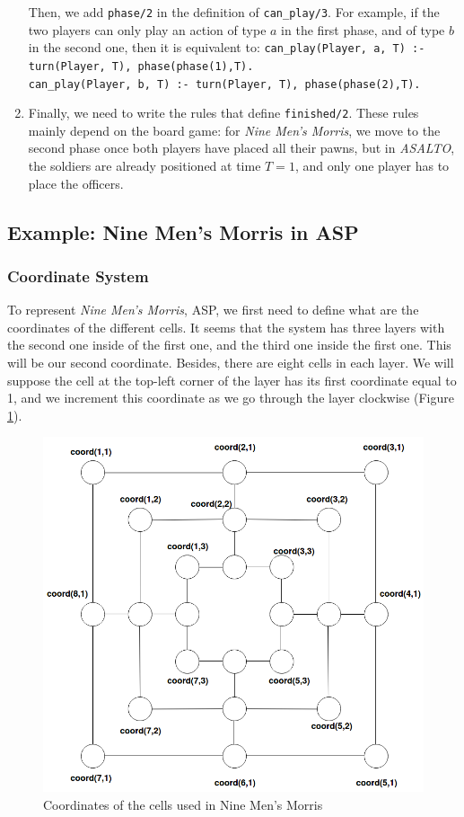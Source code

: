 \begin{enumerate}
\smallskip

Then, we add \texttt{phase/2} in the definition of \texttt{can\_play/3}. For example, if the two players can only play an action of type $a$ in the first phase, and of type $b$ in the second one, then it is equivalent to: \newline
\texttt{can\_play(Player, a, T) :- turn(Player, T), phase(phase(1),T).}\\
\texttt{can\_play(Player, b, T) :- turn(Player, T), phase(phase(2),T).}

\item Finally, we need to write the rules that define \texttt{finished/2}. These rules mainly depend on the board game: for \textit{Nine Men's Morris}, we move to the second phase once both players have placed all their pawns, but in \textit{ASALTO}, the soldiers are already positioned at time $T=1$, and only one player has to place the officers. 
\end{enumerate}

\subsection{Example: Nine Men's Morris in ASP}

\subsubsection{Coordinate System}

To represent \textit{Nine Men's Morris}, ASP, we first need to define what are the coordinates of the different cells. It seems that the system has three layers with the second one inside of the first one, and the third one inside the first one. This will be our second coordinate. Besides, there are eight cells in each layer. We will suppose the cell at the top-left corner of the layer has its first coordinate equal to 1, and we increment this coordinate as we go through the layer clockwise (Figure \ref{fig:9MM_coord}).

\begin{figure}[h]
\centering
\includegraphics[width = 0.8\hsize]{figures/9MM_coord.png}
\caption{Coordinates of the cells used in Nine Men's Morris}
\label{fig:9MM_coord}
\end{figure}

